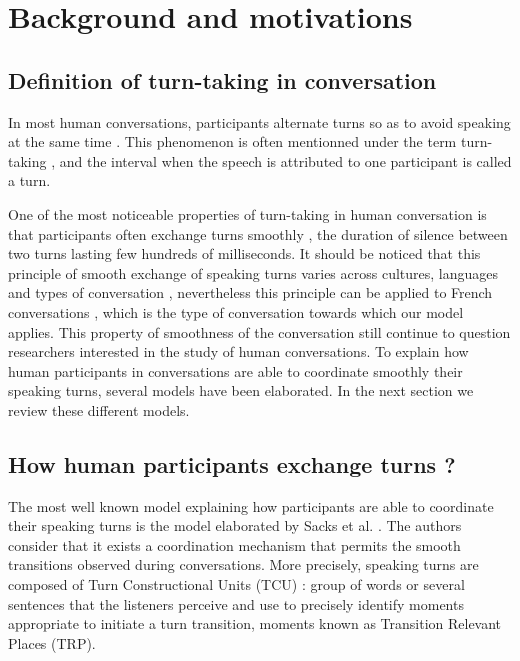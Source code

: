 
\section{Background and motivations}
\label{backgd}

\subsection{Definition of turn-taking in conversation}


In most human conversations, participants
alternate turns so as to avoid speaking at the same
time \citep{sacks_simplest_1974}. This phenomenon is often mentionned under
the term turn-taking \citep{sacks_simplest_1974}, and the interval when
the speech is attributed to one participant is called a
turn. 

One of the most noticeable properties of turn-taking in human conversation is that participants often exchange turns
smoothly \citep{heldner_pauses_2010}, the duration of silence between two turns
lasting few hundreds of milliseconds. It should be noticed that this principle
of smooth exchange of speaking turns varies across
cultures, languages and types of conversation \citep{oconnell_turntaking_2008,stivers_universals_2009},
nevertheless this principle can be applied
to French conversations \citep{mondada_multimodal_2007}, which is the type of
conversation towards which our model applies.
This property of smoothness of the conversation still continue to question researchers interested in the study of human conversations. To explain how human participants in conversations are able to coordinate smoothly their speaking turns, several models have been elaborated. In the next section we review these different models.

\subsection{How human participants exchange turns ?}
\label{social_psychology}

The most well known model explaining how participants are able to coordinate their speaking turns is the model elaborated by Sacks et al. \citep{sacks_simplest_1974}. The authors consider that it exists a coordination
mechanism that permits
the smooth transitions observed during conversations.
More precisely, speaking turns are composed of
Turn Constructional Units (TCU) : group of words or several sentences that the listeners perceive and use to precisely identify moments appropriate to initiate a turn transition, moments known as Transition Relevant Places (TRP).

